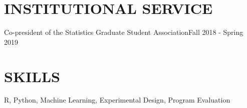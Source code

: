 \documentclass{res}
\begin{document}
\begin{resume}
\begin{comment}
\textbf{Columbia University Departments of Mathematics and Statistics}, New York, NY
  \\ \textit{Undergraduate Teaching Assistant}\hfill Spring 2014 - Spring 2016
\begin{itemize}
\item Held regular office hours for calculus, linear algebra, and statistics students
\item Evaluated assignments and provided feedback to students
\end{itemize}
\end{comment}



\section{INSTITUTIONAL SERVICE}
Co-president of the Statistics Graduate Student Association\hfill Fall 2018 - Spring 2019
\section{SKILLS}
R, Python, Machine Learning, Experimental Design, Program Evaluation  %


\end{resume}
\end{document}
